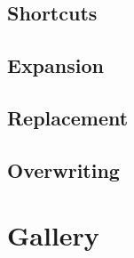 \subsection{Shortcuts}

\newpage
\subsection{Expansion}

\newpage
\subsection{Replacement}

\newpage
\subsection{Overwriting}

\newpage
\section{Gallery}


% 


